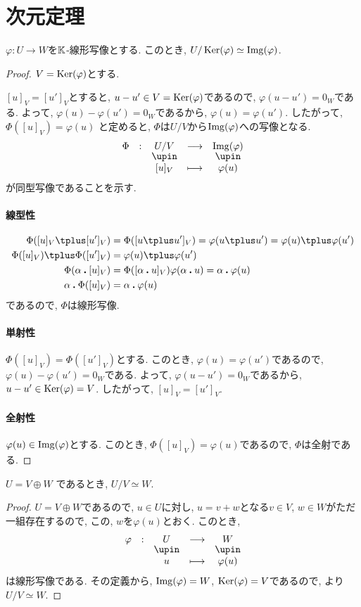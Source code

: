 \section{次元定理}
\begin{theorem}
  \label{thm:fund:hom}
  $\varphi\colon U \to W$を$\mathbb{K}$-線形写像とする.
  このとき,
  $U/\operatorname{Ker}(\varphi)\simeq \operatorname{Img}(\varphi)$.
\end{theorem}
\begin{proof}
  $V=\operatorname{Ker}(\varphi)$とする.
  
  $[u]_V=[u']_V$とすると, $u-u'\in V=\operatorname{Ker}(\varphi)$であるので,
  $\varphi(u-u')=0_W$である.
  よって, $\varphi(u)-\varphi(u')=0_W$であるから,
  $\varphi(u)=\varphi(u')$.
  したがって, $\Phi([u]_V)=\varphi(u)$
  と定めると,
  $\Phi$は$U/V$から$\operatorname{Img}(\varphi)$への写像となる.
  \begin{align*}
    \shazo{\Phi}{U/V}{\Img(\varphi)}
    {[u]_V}{\varphi(u)}
  \end{align*}
  が同型写像であることを示す.
  \paragraph{線型性}
  \begin{align*}
    \Phi([u]_V\plus [u']_V)&=\Phi([u\plus u']_V)=\varphi(u\plus u')=\varphi(u)\plus \varphi(u')\\
    \Phi([u]_V)\plus \Phi([u']_V)&=\varphi(u)\plus \varphi(u')\\
    \Phi(\alpha\act [u]_V)&=\Phi([\alpha\act u]_V)\varphi(\alpha\act u)=\alpha\act \varphi(u)\\
    \alpha\act \Phi([u]_V)&=\alpha\act \varphi(u)
  \end{align*}
  であるので, $\Phi$は線形写像.
  \paragraph{単射性}
  $\Phi([u]_V)=\Phi([u']_V)$とする.
  このとき, $\varphi(u)=\varphi(u')$であるので,
  $\varphi(u)-\varphi(u')=0_W$である.
  よって,
  $\varphi(u-u')=0_W$であるから,
  $u-u'\in \operatorname{Ker}(\varphi)=V$.
  したがって, $[u]_V=[u']_V$.
  
  \paragraph{全射性}
  $\varphi(u)\in \operatorname{Img}(\varphi)$とする.
  このとき, $\Phi([u]_V)=\varphi(u)$であるので,
  $\Phi$は全射である.
\end{proof}

\begin{cor}
$U=V\oplus W$
  であるとき, $U/V\simeq W$.
\end{cor}
\begin{proof}
$U=V\oplus W$であるので,
  $u\in U$に対し,
  $u=v+w$となる$v\in V$, $w\in W$がただ一組存在するので,
  この, $w$を$\varphi(u)$とおく.
  このとき,
  \begin{align*}
    \shazo{\varphi}{U}{W}{u}{\varphi(u)}
  \end{align*}
  は線形写像である.
  その定義から, $\operatorname{Img}(\varphi)=W$, $\operatorname{Ker}(\varphi)=V$であるので,
  より $U/V\simeq W$.
\end{proof}



